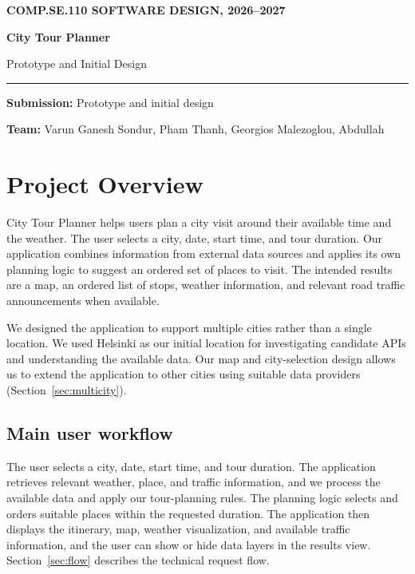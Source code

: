 \documentclass[a4paper,10pt]{article}
\begin{document}
\thispagestyle{firstpage}

{\color{accent}\small\bfseries\MakeUppercase{COMP.SE.110 Software Design, 2026--2027}\par}
\vspace{2pt}
{\color{navy}\fontsize{26}{30}\selectfont\bfseries City Tour Planner\par}
\vspace{1pt}
{\color{navy}\Large Prototype and Initial Design\par}
\vspace{5pt}
{\color{accent}\rule{\linewidth}{1.1pt}\par}
\vspace{4pt}
{\small\color{greytext}\textbf{Submission:} Prototype and initial design\par}
{\small\color{greytext}\textbf{Team:} Varun Ganesh Sondur, Pham Thanh, Georgios Malezoglou, Abdullah\par}

\section{Project Overview}
City Tour Planner helps users plan a city visit around their available time and the weather. The user selects a city, date, start time, and tour duration. Our application combines information from external data sources and applies its own planning logic to suggest an ordered set of places to visit. The intended results are a map, an ordered list of stops, weather information, and relevant road traffic announcements when available.

We designed the application to support multiple cities rather than a single location. We used Helsinki as our initial location for investigating candidate APIs and understanding the available data. Our map and city-selection design allows us to extend the application to other cities using suitable data providers (Section~\ref{sec:multicity}).

\subsection{Main user workflow}
The user selects a city, date, start time, and tour duration. The application retrieves relevant weather, place, and traffic information, and we process the available data and apply our tour-planning rules. The planning logic selects and orders suitable places within the requested duration. The application then displays the itinerary, map, weather visualization, and available traffic information, and the user can show or hide data layers in the results view. Section~\ref{sec:flow} describes the technical request flow.
\end{document}
